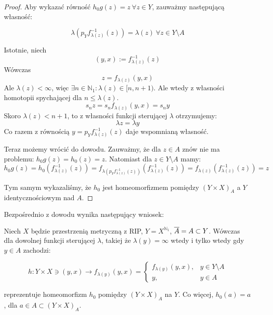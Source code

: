 \begin{thm}
\begin{proof}
    Aby wykazać równość $h_0g(z) = z\ \forall z \in Y$, zauważmy następującą własność:
    
    $$\lambda(p_Y f_{\lambda(z)}^{-1}(z)) = \lambda(z)\ \forall z \in Y \setminus A$$
    
    Istotnie, niech
    $$(y,x) := f_{\lambda(z)}^{-1}(z)$$
    Wówczas
    $$z = f_{\lambda(z)}(y,x)$$
    Ale $\lambda(z) < \infty$, więc $\exists n \in \mathbb{N}_1: \lambda(z) \in [n, n+1)$. Ale wtedy z własności homotopii spychającej dla $n \leq \lambda(z)$.
    $$s_n z = s_n f_{\lambda(z)}(y,x) = s_n y$$
    Skoro $\lambda(z) < n+1$, to z własności funkcji sterującej $\lambda$ otrzymujemy:
    $$\lambda z = \lambda y$$
    Co razem z równością $y = p_Y f_{\lambda(z)}^{-1}(z)$ daje wspomnianą własność.
    
    Teraz możemy wrócić do dowodu. Zauważmy, że dla $z \in A$ znów nie ma problemu: $h_0g(z) = h_0(z) = z$. Natomiast dla $z \in Y \setminus A$ mamy:
    $$h_0g(z) = h_0(f_{\lambda(z)}^{-1}(z)) = f_{\lambda(p_Y f_{\lambda(z)}^{-1}(z))}(f_{\lambda(z)}^{-1}(z)) = f_{\lambda(z)}(f_{\lambda(z)}^{-1}(z)) = z$$
    
    Tym samym wykazaliśmy, że $h_0$ jest homeomorfizmem pomiędzy $(Y \times X)_A$ a $Y$ identycznościowym nad $A$.
  \end{proof}
\end{thm}


Bezpośrednio z dowodu wynika następujący wniosek:
\begin{cor}
  Niech $X$ będzie przestrzenią metryczną z RIP, $Y = X^{\mathbb{N}_1}$, $\overline{A} = A \subset Y$.
  Wówczas dla dowolnej funkcji sterującej $\lambda$, takiej że $\lambda(y) = \infty$ wtedy i tylko wtedy gdy $y \in A$ zachodzi:
  
  $$h: Y \times X \ni (y,x) \rightarrow f_{\lambda(y)}(y,x) = 
    \begin{cases}
      f_{\lambda(y)}(y,x),&y \in Y \setminus A \\
      y,&y \in A
    \end{cases}$$
  
  reprezentuje homeomorfizm $h_0$ pomiędzy $(Y \times X)_A$ na $Y$. Co więcej, $h_0(a) = a$, dla $a \in A \subset (Y \times X)_A$.
\end{cor}

